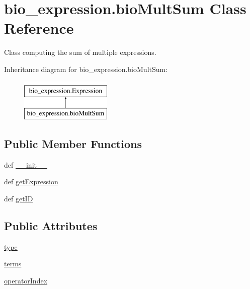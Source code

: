 \hypertarget{classbio__expression_1_1bio_mult_sum}{\section{bio\+\_\+expression.\+bio\+Mult\+Sum Class Reference}
\label{classbio__expression_1_1bio_mult_sum}
}


Class computing the sum of multiple expressions.  


Inheritance diagram for bio\+\_\+expression.\+bio\+Mult\+Sum\+:\begin{figure}[H]
\begin{center}
\leavevmode
\includegraphics[height=2.000000cm]{d9/db1/classbio__expression_1_1bio_mult_sum}
\end{center}
\end{figure}
\subsection*{Public Member Functions}
\begin{DoxyCompactItemize}
\item 
def \hyperlink{classbio__expression_1_1bio_mult_sum_ac89d1e20343c6cd77081e10331aa2b58}{\+\_\+\+\_\+init\+\_\+\+\_\+}
\item 
def \hyperlink{classbio__expression_1_1bio_mult_sum_af7ad037eb96f517a70144315192b1865}{get\+Expression}
\item 
def \hyperlink{classbio__expression_1_1bio_mult_sum_aba2497a445937def451918a231b72a30}{get\+I\+D}
\end{DoxyCompactItemize}
\subsection*{Public Attributes}
\begin{DoxyCompactItemize}
\item 
\hyperlink{classbio__expression_1_1bio_mult_sum_a725774ff889a9b510ae8710ae1931461}{type}
\item 
\hyperlink{classbio__expression_1_1bio_mult_sum_ac2578c75d1fe522acb4fcf63e7be9161}{terms}
\item 
\hyperlink{classbio__expression_1_1bio_mult_sum_a0647bf214960ea95a89b9e2676362e77}{operator\+Index}
\end{DoxyCompactItemize}


